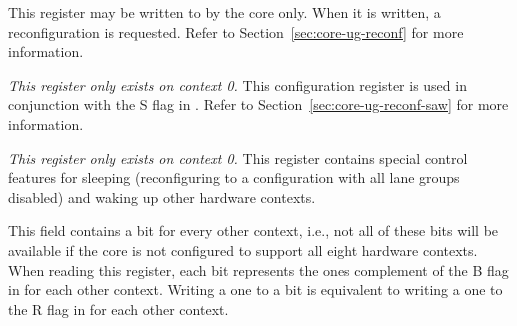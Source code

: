 

This register may be written to by the core only. When it is written, a
reconfiguration is requested. Refer to Section~\ref{sec:core-ug-reconf} for more
information.

\implementation{}



\emph{This register only exists on context 0.} This configuration register is 
used in conjunction with the S flag in . Refer to
Section~\ref{sec:core-ug-reconf-saw} for more information.

\implementation{}


\emph{This register only exists on context 0.} This register contains special 
control features for sleeping (reconfiguring to a configuration with all lane 
groups disabled) and waking up other hardware contexts.

This field contains a bit for every other context, i.e., not all of these bits
will be available if the core is not configured to support all eight hardware
contexts. When reading this register, each bit represents the ones complement
of the B flag in  for each other context. Writing a one to a bit is
equivalent to writing a one to the R flag in  for each other context.

